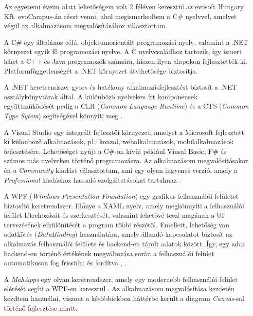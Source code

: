


Az egyetemi éveim alatt lehetőségem volt 2 féléven keresztül az evosoft Hungary Kft. evoCampus-án részt venni, ahol megismerkedtem a C\# nyelvvel, amelyet végül az alkalmazásom megvalósításához választottam.

A C\# egy általános célú, objektumorientált programozási nyelv, valamint a .NET környezet egyik fő programozási nyelve. A C nyelvcsaládhoz tartozik, így ismert lehet a C++ és Java programozók számára, hiszen ilyen alapokon fejlesztették ki. Platformfüggetlenségét a .NET környezet átvihetősége biztosítja.

A .NET keretrendszer gyors és hatékony alkalmazásfejlesztést biztosít a .NET osztálykönyvtárak által. A különböző nyelveken írt komponensek együttműködését pedig a CLR (\textit{Common Language Runtime}) és a CTS (\textit{Common Type Sytem}) segítségével könnyíti meg \cite{csharp}.


A Visual Studio egy integrált fejlesztői környezet, amelyet a Microsoft fejlesztett ki különböző alkalmazások, pl.: konzol, webalkalmazások, mobilalkalmazások fejlesztésére. Lehetőséget nyújt a C\#-on kívül például Viusal Basic, F\# és számos más nyelveken történő programozásra. Az alkalmazásom megvalósításakor én a \textit{Community} kiadást választottam, ami egy olyan ingyenes verzió, amely a \textit{Professional} kiadáshoz hasonló szolgáltatásokat tartalmaz \cite{vs}.


A WPF (\textit{Windows Presentation Foundation}) egy grafikus felhasználói felületet biztosító keretrendszer. Előnye a XAML nyelv, amely megkönnyíti a felhasználói felület létrehozását és szerkesztését, valamint lehetővé teszi magának a UI tervezésének elkülönítését a program többi részétől. Emellett, lehetőség van adatkötés (\textit{DataBinding}) használatára, amely állandó kapcsolatot biztosít az alkalmazás felhasználói felülete és backend-en tárolt adatok között. Így, egy adat backend-en történő értékének megváltozása során a felhasználói felület automatikusan fog frissülni és fordítva \cite{wpf}, \cite{databinding}.


A \textit{MahApps} egy olyan keretrendszer, amely egy modernebb felhasználói felület elérését segíti a WPF-en keresztül \cite{mahapps}. Az alkalmazásom megvalósítása kezdetén kezdtem használni, viszont a későbbiekben háttérbe került a diagram \textit{Canvas}-sal történő fejlesztése miatt.

